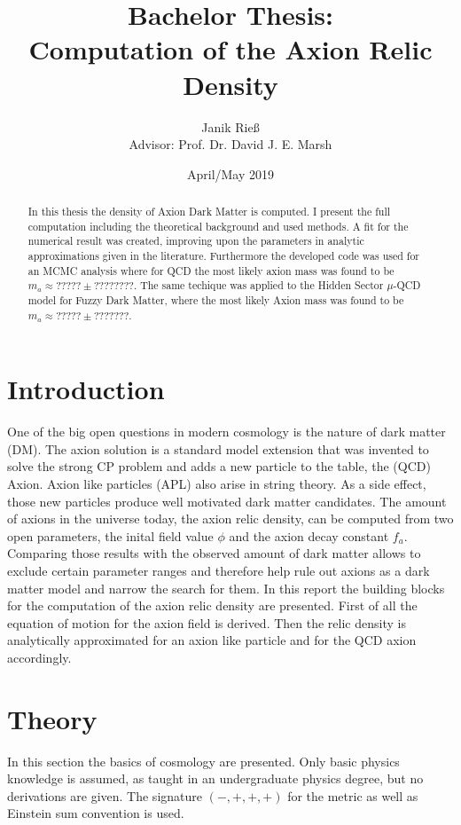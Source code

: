 \documentclass[a4paper, 12pt]{article}
\title{Bachelor Thesis: \\ Computation of the Axion Relic Density}
\author{Janik Rieß
\\[0.5cm]{Advisor:
Prof. Dr. David J. E. Marsh}
}
\date{April/May 2019}
\begin{document}
\maketitle

\begin{abstract}
    In this thesis the density of Axion Dark Matter is computed. I present the full computation including the theoretical background and used methods.
    A fit for the numerical result was created, improving upon the parameters in analytic approximations given in the literature.
    Furthermore the developed code was used for an MCMC analysis where for QCD the most likely axion mass was found to be $m_a \approx ????? \pm ????????$.
    The same techique was applied to the Hidden Sector $\mu$-QCD model for Fuzzy Dark Matter, where the most likely Axion mass was found to be $m_a \approx ????? \pm ???????$.
\end{abstract}


\newpage
\tableofcontents
\newpage

\section{Introduction}
One of the big open questions in modern cosmology is the nature of dark matter (DM).
The axion solution is a standard model extension that was invented to solve the strong CP
problem and adds a new particle to the table, the (QCD) Axion.
Axion like particles (APL) also arise in string theory.
As a side effect, those new particles produce well motivated dark matter candidates.
The amount of axions in the universe today, the axion relic density, can be computed from two open parameters, the inital field value $\phi$ and the axion decay constant $f_a$.
Comparing those results with the observed amount of dark matter allows to exclude certain
parameter ranges and therefore help rule out axions as a dark matter model and narrow the search
for them.
In this report the building blocks for the computation of the axion relic density are presented.
First of all the equation of motion for the axion field is derived. Then the relic density
is analytically approximated for an axion like particle and for the QCD axion accordingly.


\section{Theory}
In this section the basics of cosmology are presented.
Only basic physics knowledge is assumed, as taught in an undergraduate
physics degree, but no derivations are given. The signature $(-, +, +, +)$ for the metric as well as Einstein sum
convention is used.
\end{document}
